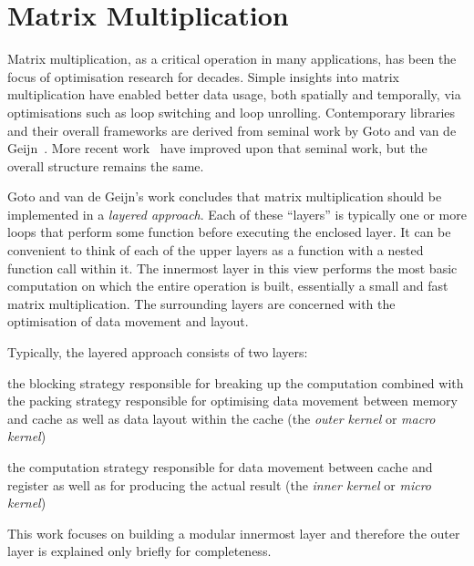 \documentclass[\main/thesis.tex]{subfiles}
\begin{document}
\chapter{Matrix Multiplication}
\label{cha:matmul}

Matrix multiplication, as a critical operation in many applications, has been the focus of optimisation research for decades.
Simple insights into matrix multiplication have enabled better data usage, both spatially and temporally, via optimisations such as loop switching and loop unrolling.
Contemporary libraries and their overall frameworks are derived from seminal work by Goto and van de Geijn~\autocite{goto2008anatomy}.
More recent work~\autocite{vanzee2015blis,zee2016blis} have improved upon that seminal work, but the overall structure remains the same.

Goto and van de Geijn's work concludes that matrix multiplication should be implemented in a \emph{layered approach}.
Each of these ``layers'' is typically one or more loops that perform some function before executing the enclosed layer.
It can be convenient to think of each of the upper layers as a function with a nested function call within it.
The innermost layer in this view performs the most basic computation on which the entire operation is built, essentially a small and fast matrix multiplication.
The surrounding layers are concerned with the optimisation of data movement and layout.

Typically, the layered approach consists of two layers:
\begin{enumerate*}[itemjoin={{; }}, itemjoin*={{; and }}, label=\textbf{(\arabic*)}, after={.}]
  \item the blocking strategy responsible for breaking up the computation combined with the packing strategy responsible for optimising data movement between memory and cache as well as data layout within the cache (the \emph{outer kernel} or \emph{macro kernel})
  \item the computation strategy responsible for data movement between cache and register as well as for producing the actual result (the \emph{inner kernel} or \emph{micro kernel})
\end{enumerate*}
This work focuses on building a modular innermost layer and therefore the outer layer is explained only briefly for completeness.
\end{document}
